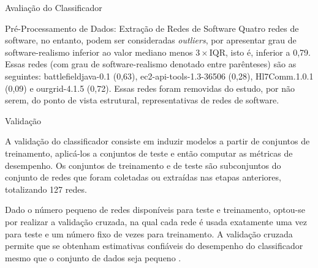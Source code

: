 \begin{section}{Avaliação do Classificador}
\begin{subsection}{Pré-Processamento de Dados: Extração de Redes de Software}
	Quatro redes de software, no entanto, podem ser consideradas \emph{outliers}, por apresentar grau de software-realismo inferior ao valor mediano menos $3 \times \mbox{IQR}$, isto é, inferior a 0,79. Essas redes (com grau de software-realismo denotado entre parênteses) são as seguintes: battlefieldjava-0.1 (0,63), ec2-api-tools-1.3-36506 (0,28), Hl7Comm.1.0.1 (0,09) e ourgrid-4.1.5 (0,72). Essas redes foram removidas do estudo, por não serem, do ponto de vista estrutural, representativas de redes de software.

\end{subsection}

\begin{subsection}{Validação}

	A validação do classificador consiste em induzir modelos a partir de conjuntos de treinamento, aplicá-los a conjuntos de teste e então computar as métricas de desempenho. Os conjuntos de treinamento e de teste são subconjuntos do conjunto de redes que foram coletadas ou extraídas nas etapas anteriores, totalizando 127 redes.
	
	Dado o número pequeno de redes disponíveis para teste e treinamento, optou-se por realizar a validação cruzada, na qual cada rede é usada exatamente uma vez para teste e um número fixo de vezes para treinamento. A validação cruzada permite que se obtenham estimativas confiáveis do desempenho do classificador mesmo que o conjunto de dados seja pequeno \cite{Witten2005}.
	



\end{subsection}
\end{section}
